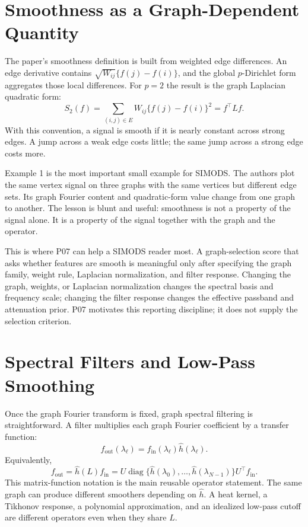 \documentclass[11pt]{article}
\begin{document}
\section{Smoothness as a Graph-Dependent Quantity}

The paper's smoothness definition is built from weighted edge differences.  An
edge derivative contains $\sqrt{W_{ij}}\{f(j)-f(i)\}$, and the global
$p$-Dirichlet form aggregates those local differences.  For $p=2$ the result
is the graph Laplacian quadratic form:
\[
  S_2(f)
  =
  \sum_{(i,j)\in E} W_{ij}\{f(j)-f(i)\}^2
  =
  f^\top L f.
\]
With this convention, a signal is smooth if it is nearly constant across
strong edges.  A jump across a weak edge costs little; the same jump across a
strong edge costs more.

Example 1 is the most important small example for SIMODS.  The authors plot
the same vertex signal on three graphs with the same vertices but different
edge sets.  Its graph Fourier content and quadratic-form value change from
one graph to another.  The lesson is blunt and useful: smoothness is not a
property of the signal alone.  It is a property of the signal together with
the graph and the operator.

This is where P07 can help a SIMODS reader most.  A graph-selection score that
asks whether features are smooth is meaningful only after specifying the graph
family, weight rule, Laplacian normalization, and filter response.  Changing
the graph, weights, or Laplacian normalization changes the spectral basis and
frequency scale; changing the filter response changes the effective passband
and attenuation prior.  P07 motivates this reporting discipline; it does not
supply the selection criterion.

\section{Spectral Filters and Low-Pass Smoothing}

Once the graph Fourier transform is fixed, graph spectral filtering is
straightforward.  A filter multiplies each graph Fourier coefficient by a
transfer function:
\[
  \hat f_{\mathrm{out}}(\lambda_\ell)
  =
  \hat f_{\mathrm{in}}(\lambda_\ell)\hat h(\lambda_\ell).
\]
Equivalently,
\[
  f_{\mathrm{out}}
  =
  \hat h(L)f_{\mathrm{in}}
  =
  U\operatorname{diag}\{\hat h(\lambda_0),\ldots,
    \hat h(\lambda_{N-1})\}U^\top f_{\mathrm{in}}.
\]
This matrix-function notation is the main reusable operator statement.  The
same graph can produce different smoothers depending on $\hat h$.  A heat
kernel, a Tikhonov response, a polynomial approximation, and an idealized
low-pass cutoff are different operators even when they share $L$.
\end{document}
